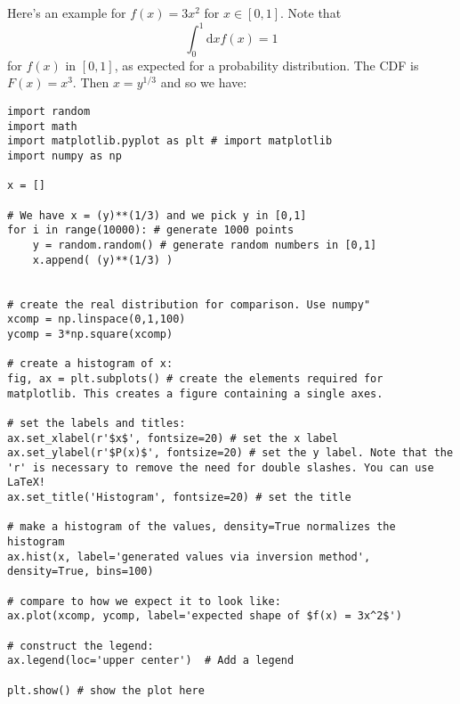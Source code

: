 \documentclass[../../../main.tex]{subfiles}
\begin{document}
Here's an example for $f(x)=3x^2$ for $x \in [0,1]$. 
Note that 
\begin{equation*}
    \int_0^1 \mathrm{d} x f(x)= 1
\end{equation*}
for $f(x)$ in $[0,1]$, as expected for a probability distribution.
The CDF is $F(x) = x^3$. 
Then $x = y^{1/3}$ and so we have:
\begin{verbatim}
import random 
import math
import matplotlib.pyplot as plt # import matplotlib
import numpy as np

x = []

# We have x = (y)**(1/3) and we pick y in [0,1] 
for i in range(10000): # generate 1000 points
    y = random.random() # generate random numbers in [0,1]
    x.append( (y)**(1/3) )


# create the real distribution for comparison. Use numpy"
xcomp = np.linspace(0,1,100)
ycomp = 3*np.square(xcomp)
    
# create a histogram of x:
fig, ax = plt.subplots() # create the elements required for matplotlib. This creates a figure containing a single axes.

# set the labels and titles:
ax.set_xlabel(r'$x$', fontsize=20) # set the x label
ax.set_ylabel(r'$P(x)$', fontsize=20) # set the y label. Note that the 'r' is necessary to remove the need for double slashes. You can use LaTeX! 
ax.set_title('Histogram', fontsize=20) # set the title 

# make a histogram of the values, density=True normalizes the histogram
ax.hist(x, label='generated values via inversion method', density=True, bins=100) 

# compare to how we expect it to look like:
ax.plot(xcomp, ycomp, label='expected shape of $f(x) = 3x^2$')

# construct the legend:
ax.legend(loc='upper center')  # Add a legend

plt.show() # show the plot here
\end{verbatim}
\end{document}
